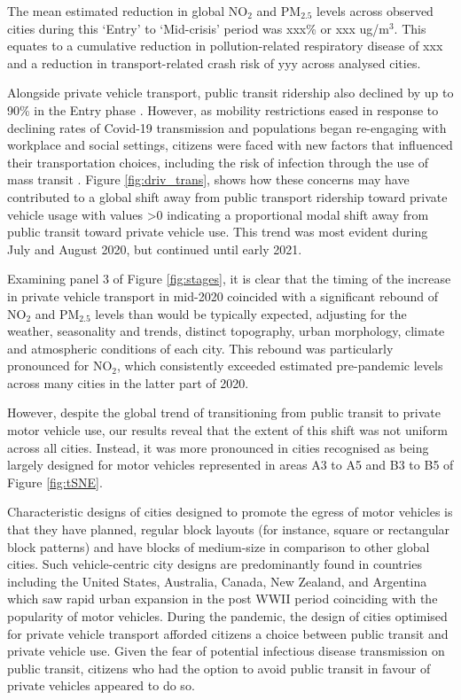 \documentclass[preprint,12pt]{elsarticle}
\begin{document}
The mean estimated reduction in global NO$_{2}$ and PM$_{2.5}$ levels across observed cities during this `Entry' to `Mid-crisis' period was xxx\% or xxx ug/m$^{3}$. This equates to a cumulative reduction in pollution-related respiratory disease of xxx and a reduction in transport-related crash risk of yyy across analysed cities.

Alongside private vehicle transport, public transit ridership also declined by up to 90\% in the Entry phase \cite{TransitCovid_Gkiotsalitis}. However, as mobility restrictions eased in response to declining rates of Covid-19 transmission and populations began re-engaging with workplace and social settings, citizens were faced with new factors that influenced their transportation choices, including the risk of infection through the use of mass transit \cite{BECKTransit}. Figure \ref{fig:driv_trans}, shows how these concerns may have contributed to a global shift away from public transport ridership toward private vehicle usage with values \textgreater 0 indicating a proportional modal shift away from public transit toward private vehicle use. This trend was most evident during July and August 2020, but continued until early 2021.

Examining panel 3 of Figure \ref{fig:stages}, it is clear that the timing of the increase in private vehicle transport in mid-2020 coincided with a significant rebound of NO$_{2}$ and PM$_{2.5}$ levels than would be typically expected, adjusting for the weather, seasonality and trends, distinct topography, urban morphology, climate and atmospheric conditions of each city. This rebound was particularly pronounced for NO$_{2}$, which consistently exceeded estimated pre-pandemic levels across many cities in the latter part of 2020.

However, despite the global trend of transitioning from public transit to private motor vehicle use, our results reveal that the extent of this shift was not uniform across all cities. Instead, it was more pronounced in cities recognised as being largely designed for motor vehicles \cite{Thompson2020} represented in areas A3 to A5 and B3 to B5 of Figure \ref{fig:tSNE}.

Characteristic designs of cities designed to promote the egress of motor vehicles is that they have planned, regular block layouts (for instance, square or rectangular block patterns) and have blocks of medium-size in comparison to other global cities. Such vehicle-centric city designs are predominantly found in countries including the United States, Australia, Canada, New Zealand, and Argentina which saw rapid urban expansion in the post WWII period coinciding with the popularity of motor vehicles. During the pandemic, the design of cities optimised for private vehicle transport afforded citizens a choice between public transit and private vehicle use. Given the fear of potential infectious disease transmission on public transit, citizens who had the option to avoid public transit in favour of private vehicles appeared to do so.
\end{document}
